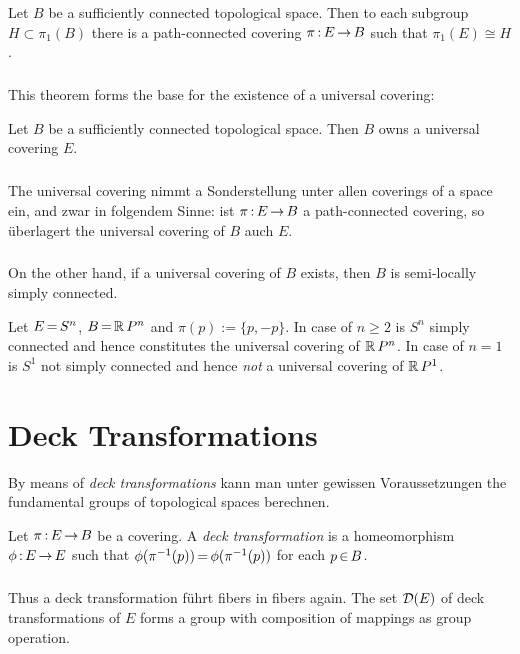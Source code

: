 \documentclass[11pt,twoside]{article}
\def\E{E}
\def\B{B}
\begin{document}
\begin{theorem1}
Let $\B$ be a sufficiently connected topological space.
Then to each subgroup $H \subset \pi_1(\B)$
there is a path-connected covering $\pi \:\E \xto \B$
such that $\pi_1(\E) \cong H$.
\end{theorem1}

\subparagraph{}
This theorem forms the base for the existence of a universal covering:

\begin{theorem1}
Let $\B$ be a sufficiently connected topological space.
Then $\B$ owns a universal covering $\E$.
\end{theorem1}

\subparagraph{}
The universal covering nimmt a Sonderstellung unter allen
coverings of a space ein, and zwar in folgendem Sinne:
ist $\pi\:\E \xto \B$ a path-connected covering,
so \"uberlagert the universal covering of $\B$ auch $\E$.

\subparagraph{}
On the other hand,
if a universal covering of $\B$ exists,
then $\B$ is semi-locally simply connected.

\begin{example}
Let $\E \eq S^n$, $\B \eq \R\,P^n$ and $\pi(p) := \{p,-p\}$.
In case of $n \geq 2$ is $S^n$ simply connected and hence constitutes
the universal covering of ${\mathbb{R}}\,P^n$.
In case of $n=1$ is $S^1$ not simply connected and hence
\textit{not} a universal covering of ${\mathbb{R}}\,P^1$.
\end{example}

\section{Deck Transformations}
By means of \textit{deck transformations} kann man unter gewissen
Voraussetzungen the fundamental groups of topological spaces berechnen.

\begin{definition}
Let $\pi \:\E \xto \B$ be a covering.
A \textit{deck transformation} is a homeomorphism $\phi \: \E \xto E$
such that
$\phi(\pi^{-1}(p)) {\,=\,} \phi(\pi^{-1}(p))$ for each $p \xeof \B$.
\end{definition}

\subparagraph{}
Thus a deck transformation f\"uhrt fibers in fibers again.
The set $\cal{D}(\E)$ of deck transformations of $\E$
forms a group with composition of mappings as group operation.
\end{document}
